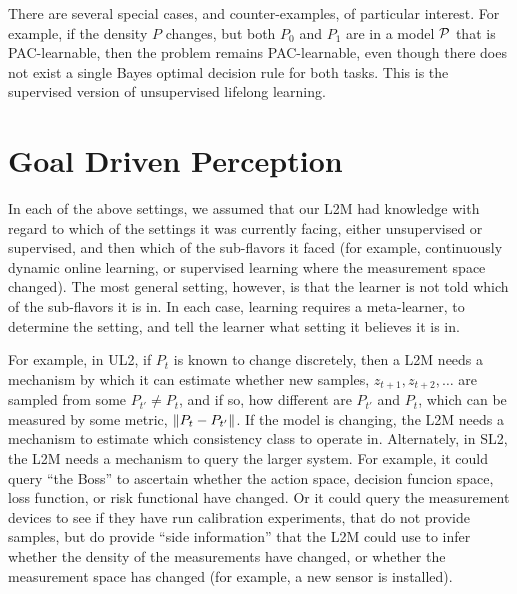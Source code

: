 \documentclass{article}
\begin{document}
There are several special cases, and counter-examples, of particular interest.  For example, if the density $P$ changes, but both $P_0$ and $P_1$ are in a model $\mathcal{P}$ that is PAC-learnable, then the problem remains PAC-learnable, even though there does not exist a single Bayes optimal decision rule for both tasks. This is the supervised version of unsupervised lifelong learning.  



\section{Goal Driven Perception}
\label{sec:goal_driven}




In each of the above settings, we assumed that our L2M had  knowledge with regard to which of the  settings it was currently facing, either unsupervised or supervised, and then which of the sub-flavors it faced (for example, continuously dynamic online learning, or supervised learning where the measurement space changed).  The most general setting, however, is that the learner is not told which of the sub-flavors it is in.  In each case, learning requires a meta-learner, to determine the setting, and tell the learner what setting it believes it is in. 

For example, in UL2,  if $P_t$ is known to change discretely, then a L2M needs a mechanism by which it can estimate whether  new samples, $z_{t+1}, z_{t+2},\ldots$ are sampled from some $P_{t'} \neq P_t$, and if so, how different are $P_{t'}$ and $P_t$, which can be measured by some metric, $\left \lVert P_t - P_{t'} \right \rVert$.  If the model is changing, the L2M needs a mechanism to estimate which consistency class to operate in. Alternately, in SL2, the L2M needs a mechanism to query the larger system.  For example, it could query ``the Boss'' to ascertain whether the action space, decision funcion space, loss function, or risk functional have changed.  Or it could query the measurement devices to see if they have run calibration experiments, that do not provide samples, but do provide ``side information'' that the L2M could use to infer whether the density of the measurements have changed, or whether the measurement space has changed (for example, a new sensor is installed).  
\end{document}
